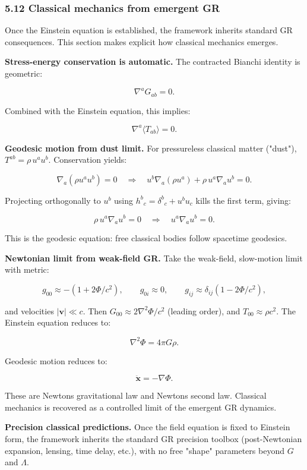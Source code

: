 \subsubsection{5.12 Classical mechanics from emergent GR}\label{512-classical-mechanics-from-emergent-gr}

Once the Einstein equation is established, the framework inherits standard GR consequences. This section makes explicit how classical mechanics emerges.

\textbf{Stress-energy conservation is automatic.} The contracted Bianchi identity is geometric:

\[
\nabla^a G_{ab} = 0.
\]

Combined with the Einstein equation, this implies:

\[
\nabla^a \langle T_{ab} \rangle = 0.
\]

\textbf{Geodesic motion from dust limit.} For pressureless classical matter ("dust"), \(T^{ab} = \rho \, u^a u^b\). Conservation yields:

\[
\nabla_a(\rho u^a u^b) = 0
\quad \Rightarrow \quad
u^b \nabla_a(\rho u^a) + \rho \, u^a \nabla_a u^b = 0.
\]

Projecting orthogonally to \(u^b\) using \(h^b{}_c = \delta^b{}_c + u^b u_c\) kills the first term, giving:

\[
\rho \, u^a \nabla_a u^b = 0
\quad \Rightarrow \quad
u^a \nabla_a u^b = 0.
\]

This is the geodesic equation: free classical bodies follow spacetime geodesics.

\textbf{Newtonian limit from weak-field GR.} Take the weak-field, slow-motion limit with metric:

\[
g_{00} \approx -(1 + 2\Phi/c^2), \qquad
g_{0i} \approx 0, \qquad
g_{ij} \approx \delta_{ij}(1 - 2\Phi/c^2),
\]

and velocities \(|\mathbf{v}| \ll c\). Then \(G_{00} \approx 2\nabla^2\Phi/c^2\) (leading order), and \(T_{00} \approx \rho c^2\). The Einstein equation reduces to:

\[
\nabla^2 \Phi = 4\pi G \rho.
\]

Geodesic motion reduces to:

\[
\ddot{\mathbf{x}} = -\nabla \Phi.
\]

These are Newton\textquotesingle s gravitational law and Newton\textquotesingle s second law. Classical mechanics is recovered as a controlled limit of the emergent GR dynamics.

\textbf{Precision classical predictions.} Once the field equation is fixed to Einstein form, the framework inherits the standard GR precision toolbox (post-Newtonian expansion, lensing, time delay, etc.), with no free "shape" parameters beyond \(G\) and \(\Lambda\).

